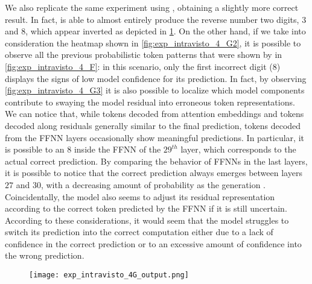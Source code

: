 We also replicate the same experiment using , obtaining a slightly more correct result.
In fact,  is able to almost entirely produce the reverse number  two digits, $3$ and $8$, which appear inverted as depicted in \cref{fig:exp_intravisto_4_G1}.
On the other hand, if we take into consideration the heatmap shown in \cref{fig:exp_intravisto_4_G2}, it is possible to observe all the previous probabilistic token patterns that were shown by  in \cref{fig:exp_intravisto_4_F}: in this scenario, only the first incorrect digit ($8$) displays the signs of low model confidence for its prediction.
In fact, by observing \cref{fig:exp_intravisto_4_G3} it is also possible to localize which model components contribute to swaying the model residual into erroneous token representations.
We can notice that, while tokens decoded from attention embeddings  and tokens decoded along residuals  generally similar to the final prediction, tokens decoded from the FFNN layers occasionally show meaningful predictions.
In particular, it is possible to  an $8$ inside the FFNN of the $29^{th}$ layer, which corresponds to the actual correct prediction.
By comparing the behavior of FFNNs in the last layers, it is possible to notice that the correct prediction always emerges between layers $27$ and $30$, with a decreasing amount of probability as the generation .
Coincidentally, the model also seems to adjust its residual representation according to the correct token predicted by the FFNN if it is still uncertain.
According to these considerations, it would seem that the model struggles to switch its prediction into the correct computation either due to a lack of confidence in the correct prediction or to an excessive amount of confidence into the wrong prediction.

\begin{figure}[t!]
    \centering
    \texttt{[image: exp\_intravisto\_4G\_output.png]}
    \caption{}
    \label{fig:exp_intravisto_4_G1}
\end{figure}

\begin{figure}[t!]
    \centering
    \quad
    \caption{}
    \label{fig:exp_intravisto_4_G}
\end{figure}

